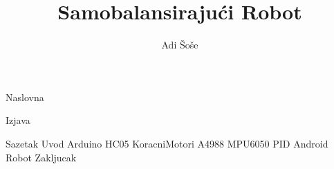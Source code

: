 \documentclass[12pt,a4paper]{article}
\title{Samobalansirajući Robot}
\author{Adi Šoše}
\begin{document}
\selectfont


{Naslovna}

{Izjava}
\pagebreak

\setcounter{page}{1}
\renewcommand*\contentsname{Sadržaj}
\tableofcontents

\pagebreak
{}



\linespread{1.3}

{Sazetak}
{Uvod}
{Arduino}
{HC05}
{KoracniMotori}
{A4988}
{MPU6050}
{PID}
{Android}
{Robot}
{Zakljucak}

\clearpage
\listofcodes
\listoftables
\listoffigures

\printbibliography[title={Literatura}]
\end{document}
